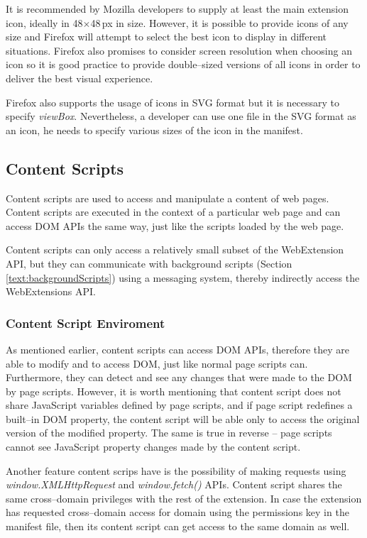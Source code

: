 It is recommended by Mozilla developers to supply at least the main extension icon, ideally in 48$\times$48\,px in size. However, it is possible to provide icons of any size and Firefox will attempt to select the best icon to display in different situations. Firefox also promises to consider screen resolution when choosing an icon so it is good practice to provide double--sized versions of all icons in order to deliver the best visual experience.

Firefox also supports the usage of icons in SVG format but it is necessary to specify \textit{viewBox}. Nevertheless, a developer can use one file in the SVG format as an icon, he needs to specify various sizes of the icon in the manifest.

\subsection{Content Scripts}
Content scripts are used to access and manipulate a content of web pages. Content scripts are executed in the context of a particular web page and can access DOM APIs the same way, just like the scripts loaded by the web page.

Content scripts can only access a relatively small subset of the WebExtension API, but they can communicate with background scripts (Section \ref{text:backgroundScripts}) using a messaging system, thereby indirectly access the WebExtensions API.

\subsubsection*{Content Script Enviroment}
As mentioned earlier, content scripts can access DOM APIs, therefore they are able to modify and to access DOM, just like normal page scripts can. Furthermore, they can detect and see any changes that were made to the DOM by page scripts. However, it is worth mentioning that content script does not share JavaScript variables defined by page scripts, and if page script redefines a built--in DOM property, the content script will be able only to access the original version of the modified property. The same is true in reverse -- page scripts cannot see JavaScript property changes made by the content script.

Another feature content scrips have is the possibility of making requests using \textit{window.XMLHttpRequest} and \textit{window.fetch()} APIs. Content script shares the same cross--domain privileges with the rest of the extension. In case the extension has requested cross--domain access for domain using the permissions key in the manifest file, then its content script can get access to the same domain as well.

